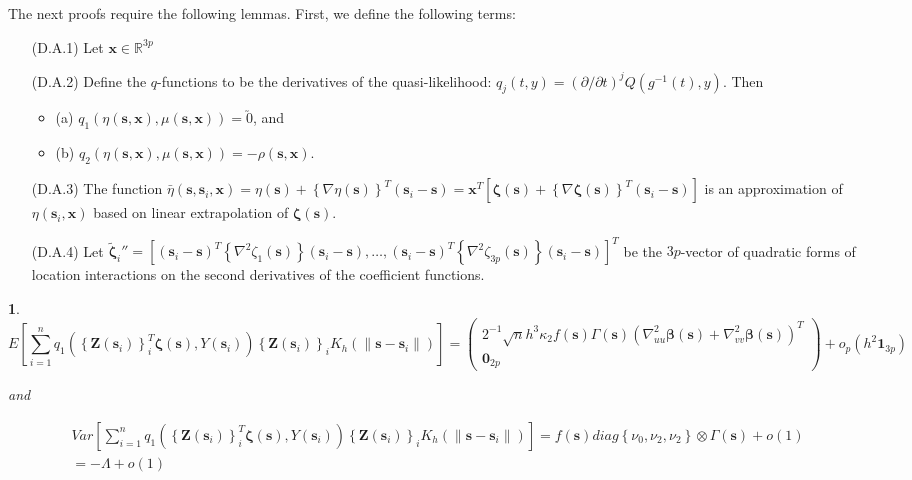 \documentclass[12pt,english,authoryear, review]{article}\usepackage[]{graphicx}\usepackage[]{color}
\theoremstyle{plain}
\theoremstyle{plain}
\newtheorem{lem}{\protect\lemmaname}
\providecommand{\lemmaname}{Lemma}
\begin{document}
The next proofs require the following lemmas. First, we define the
following terms:
\begin{itemize}
\item[(D.A.1)] Let $\bm{x}\in\mathbb{R}^{3p}$
\item[(D.A.2)] Define the $q$-functions to be the derivatives of the quasi-likelihood:
$q_{j}(t,y)=\left(\partial/\partial t\right)^{j}Q\left(g^{-1}\left(t\right),y\right)$.
Then

\begin{itemize}
\item (a) $q_{1}\left(\eta\left(\bm{s},\bm{x}\right),\mu\left(\bm{s},\bm{x}\right)\right)=\utilde{0}$,
and 
\item (b) $q_{2}\left(\eta\left(\bm{s},\bm{x}\right),\mu\left(\bm{s},\bm{x}\right)\right)=-\rho\left(\bm{s},\bm{x}\right)$.
\end{itemize}
\item[(D.A.3)] The function $\bar{\eta}\left(\bm{s},\bm{s}_{i},\bm{x}\right)=\eta\left(\bm{s}\right)+\left\{ \nabla\eta\left(\bm{s}\right)\right\} ^{T}\left(\bm{s}_{i}-\bm{s}\right)=\bm{x}^{T}\left[\bm{\zeta}\left(\bm{s}\right)+\left\{ \nabla\bm{\zeta}\left(\bm{s}\right)\right\} ^{T}\left(\bm{s}_{i}-\bm{s}\right)\right]$
is an approximation of $\eta\left(\bm{s}_{i},\bm{x}\right)$ based
on linear extrapolation of $\bm{\zeta}\left(\bm{s}\right)$.
\item[(D.A.4)] Let $\tilde{\bm{\zeta}}_{i}''=\left[\left(\bm{s}_{i}-\bm{s}\right)^{T}\left\{ \nabla^{2}\zeta_{1}\left(\bm{s}\right)\right\} \left(\bm{s}_{i}-\bm{s}\right),\dots,\left(\bm{s}_{i}-\bm{s}\right)^{T}\left\{ \nabla^{2}\zeta_{3p}\left(\bm{s}\right)\right\} \left(\bm{s}_{i}-\bm{s}\right)\right]^{T}$
be the $3p$-vector of quadratic forms of location interactions on
the second derivatives of the coefficient functions.\end{itemize}
\begin{lem}
\label{lemma:omega}
\[
E\left[\sum_{i=1}^{n}q_{1}\left(\left\{ \bm{Z}\left(\bm{s}_{i}\right)\right\} _{i}^{T}\bm{\zeta}\left(\bm{s}\right),Y\left(\bm{s}_{i}\right)\right)\left\{ \bm{Z}\left(\bm{s}_{i}\right)\right\} _{i}K_{h}\left(\|\bm{s}-\bm{s}_{i}\|\right)\right]=\left(\begin{array}{c}
2^{-1}\sqrt{n}h^{3}\kappa_{2}f\left(\bm{s}\right)\Gamma\left(\bm{s}\right)\left(\nabla_{uu}^{2}\bm{\beta}\left(\bm{s}\right)+\nabla_{vv}^{2}\bm{\beta}\left(\bm{s}\right)\right)^{T}\\
\bm{0}_{2p}
\end{array}\right)+o_{p}\left(h^{2}\bm{1}_{3p}\right)
\]


and 

\begin{multline*}
Var\left[\sum_{i=1}^{n}q_{1}\left(\left\{ \bm{Z}\left(\bm{s}_{i}\right)\right\} _{i}^{T}\bm{\zeta}\left(\bm{s}\right),Y\left(\bm{s}_{i}\right)\right)\left\{ \bm{Z}\left(\bm{s}_{i}\right)\right\} _{i}K_{h}\left(\|\bm{s}-\bm{s}_{i}\|\right)\right]=f\left(\bm{s}\right)diag\left\{ \nu_{0},\nu_{2},\nu_{2}\right\} \otimes\Gamma\left(\bm{s}\right)+o\left(1\right)\\
=-\Lambda+o\left(1\right)
\end{multline*}

\end{lem}
\end{document}
